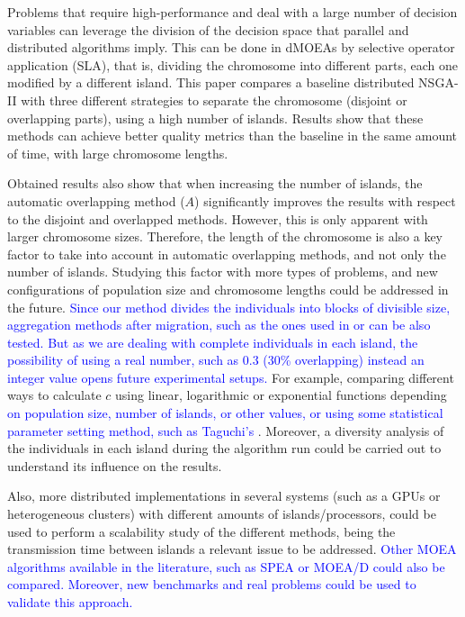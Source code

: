 \documentclass[preprint]{elsarticle}
\begin{document}
Problems that require high-performance 
 and deal with a large number of decision variables can leverage the
 division of the decision space that parallel and distributed
 algorithms imply. This can be done in dMOEAs by selective operator application (SLA), that is, dividing the
 chromosome into different parts, each one modified by a different
 island. This paper compares a baseline distributed NSGA-II with three
 different strategies to separate the chromosome (disjoint or
 overlapping parts), using a high number of islands. Results show that
 these methods can achieve better quality metrics than the baseline in
 the same amount of time, with large chromosome lengths. 

Obtained results also show that when increasing the number of islands, the
automatic overlapping method ($A$) significantly improves the results with
respect to the disjoint and overlapped methods. However, this is only
apparent with larger chromosome sizes. Therefore, the length of the
chromosome is also a key factor to take into account in automatic overlapping
methods, and not only the number of islands. Studying this factor with
more types of problems, and new configurations of population size and
chromosome lengths could be addressed in the future. \textcolor{blue}{Since our method divides the individuals into blocks of divisible size, aggregation methods after migration, such as the ones used in \cite{Kimovski15Parallel} or \cite{Dorronsoro13superlinear} can be also tested. But as we are dealing with complete individuals in each island, the possibility of using a real number, such as 0.3 (30\% overlapping) instead an integer value opens future experimental setups.}
For example, comparing 
different ways to calculate $c$ using linear, logarithmic or exponential functions
depending \textcolor{blue}{on population size, number of islands, or other values, or using some statistical parameter setting method, such as Taguchi's \cite{Keratmatpour2018Taguchi}}. Moreover, a diversity analysis of the individuals
in each island during the algorithm run could be carried out to understand its influence
on the results.
% 

Also, more distributed implementations in several systems (such as a
GPUs or heterogeneous clusters) with different amounts of
islands/processors, could be used to perform a scalability study of the
different methods, being the transmission time between islands a
relevant issue to be addressed. \textcolor{blue}{Other MOEA algorithms available in the literature, such as SPEA or MOEA/D could also be compared. Moreover, new benchmarks and real problems
could be  used to validate this approach.}
\end{document}
